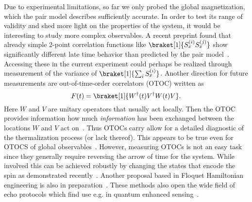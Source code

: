 Due to experimental limitations, so far we only probed the global magnetization, which the pair model describes sufficiently accurate. In order to test its range of validity and shed more light on the properties of the system, it would be interesting to study more complex observables. A recent preprint found that already simple 2-point correlation functions like $\braket[1]{S_x^{(i)}S_x^{(j)}}$ show significantly different late time behavior than predicted by the pair model~\cite{mukherjeeInfluenceDisorderedAnisotropic2024}. Accessing these in the current experiment could perhaps be realized through measurement of the variance of $\braket[1]{\sum_i S_x^{(i)}}$.
Another direction for future measurements are out-of-time-order correlators (OTOC) written as
\begin{equation}
	F(t) = \braket[1]{W^\dagger(t)V^\dagger W(t)V}.
\end{equation}
Here $W$ and $V$ are unitary operators that usually act locally. Then the OTOC provides information how much \emph{information} has been exchanged between the locations $W$ and $V$ act on~\cite{chenOutTimeOrder2017,swingleUnscramblingPhysicsOutoftimeorder2018,luitzEmergentLocalitySystems2019,xuScramblingDynamicsOutofTimeOrdered2024}. Thus OTOCs carry allow for a detailed diagnostic of the thermalization process (or lack thereof). This appears to be true even for OTOCS of global observables~\cite{lozano-negroGlobalOutTime2024}. However, measuring OTOCs is not an easy task since they generally require reversing the arrow of time for the system. While involved this can be achieved robustly by changing the states that encode the spin as demonstrated recently~\cite{geierTimereversalDipolarQuantum2024}. Another proposal based in Floquet Hamiltonian engineering is also in preparation~\cite{muellenbachOTOC}. 
These methods also open the wide field of echo protocols which find use e.g. in quantum enhanced sensing~\cite{davisApproachingHeisenbergLimit2016,linnemannQuantumEnhancedSensingBased2016,colomboTimereversalbasedQuantumMetrology2022}.

